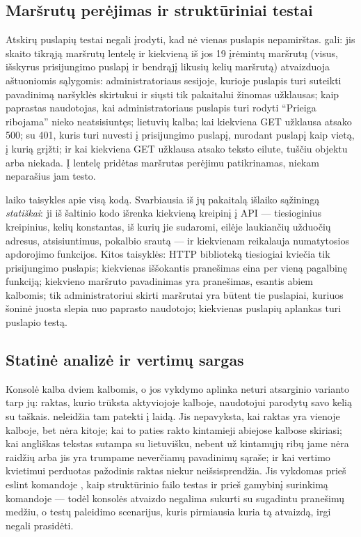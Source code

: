 \subsection{Maršrutų perėjimas ir struktūriniai testai}\label{sec:testing:console:sweep}

Atskirų puslapių testai negali įrodyti, kad nė vienas puslapis nepamirštas.
 gali: jis skaito tikrąją maršrutų lentelę ir kiekvieną
iš jos 19 įrėmintų maršrutų (visus, išskyrus prisijungimo puslapį ir bendrąjį likusių kelių
maršrutą) atvaizduoja aštuoniomis sąlygomis: administratoriaus sesijoje, kurioje puslapis turi
suteikti pavadinimą naršyklės skirtukui ir siųsti tik pakaitalui žinomas užklausas; kaip
paprastas naudotojas, kai administratoriaus puslapis turi rodyti \enquote{Prieiga ribojama}
nieko neatsisiuntęs; lietuvių kalba; kai kiekviena GET užklausa atsako 500; su 401, kuris turi
nuvesti į prisijungimo puslapį, nurodant puslapį kaip vietą, į kurią grįžti; ir kai kiekviena GET
užklausa atsako teksto eilute, tuščiu objektu arba niekada. Į lentelę pridėtas maršrutas
perėjimu patikrinamas, niekam neparašius jam testo.

 laiko taisykles apie visą kodą. Svarbiausia iš jų pakaitalą
išlaiko sąžiningą \emph{statiškai}: ji iš šaltinio kodo išrenka kiekvieną kreipinį į API ---
tiesioginius kreipinius, kelių konstantas, iš kurių jie sudaromi, eilėje laukiančių užduočių
adresus, atsisiuntimus, pokalbio srautą --- ir kiekvienam reikalauja numatytosios apdorojimo
funkcijos. Kitos taisyklės: HTTP biblioteką tiesiogiai kviečia tik prisijungimo puslapis;
kiekvienas iššokantis pranešimas eina per vieną pagalbinę funkciją; kiekvieno maršruto
pavadinimas yra pranešimas, esantis abiem kalbomis; tik administratoriui skirti maršrutai yra
būtent tie puslapiai, kuriuos šoninė juosta slepia nuo paprasto naudotojo; kiekvienas puslapių
aplankas turi puslapio testą.

\subsection{Statinė analizė ir vertimų sargas}\label{sec:testing:console:lint}

Konsolė kalba dviem kalbomis, o jos vykdymo aplinka neturi atsarginio varianto tarp jų: raktas,
kurio trūksta aktyviojoje kalboje, naudotojui parodytų savo kelią su taškais.
 neleidžia tam patekti į laidą. Jis nepavyksta, kai raktas yra
vienoje kalboje, bet nėra kitoje; kai to paties rakto kintamieji abiejose kalbose skiriasi; kai
angliškas tekstas sutampa su lietuvišku, nebent už kintamųjų ribų jame nėra raidžių arba jis yra
trumpame neverčiamų pavadinimų sąraše; ir kai vertimo kvietimui perduotas pažodinis raktas
niekur neišsisprendžia. Jis vykdomas prieš eslint komandoje , kaip
struktūrinio failo testas ir prieš gamybinį surinkimą komandoje  --- todėl
konsolės atvaizdo negalima sukurti su sugadintu pranešimų medžiu, o testų paleidimo scenarijus,
kuris pirmiausia kuria tą atvaizdą, irgi negali prasidėti.



